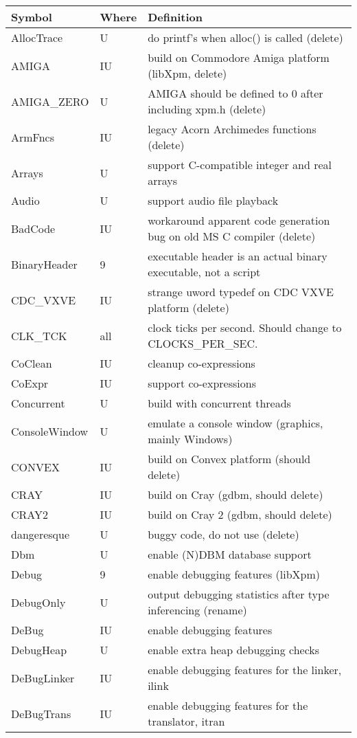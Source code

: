 \begin{xtabular}{|m{1.8in}|m{0.5in}|m{4.0in}|}
\hline
Symbol & Where & Definition \\ \hline
AllocTrace & U & do printf's when alloc() is called (delete) \\
AMIGA & IU & build on Commodore Amiga platform (libXpm, delete) \\ 
AMIGA\_ZERO & U & AMIGA should be defined to 0 after including xpm.h (delete) \\ 
ArmFncs & IU & legacy Acorn Archimedes functions (delete) \\
Arrays & U & support C-compatible integer and real arrays \\
Audio & U & support audio file playback \\
BadCode & IU & workaround apparent code generation bug on old MS C compiler (delete) \\
BinaryHeader & 9 & executable header is an actual binary executable,
		not a script \\
CDC\_VXVE & IU & strange uword typedef on CDC VXVE platform (delete) \\
CLK\_TCK & all & clock ticks per second. Should change to CLOCKS\_PER\_SEC. \\
CoClean & IU & cleanup co-expressions \\
CoExpr & IU & support co-expressions \\
Concurrent & U & build with concurrent threads \\
ConsoleWindow & U & emulate a console window (graphics, mainly Windows) \\
CONVEX & IU & build on Convex platform (should delete) \\
CRAY & IU & build on Cray (gdbm, should delete) \\
CRAY2 & IU & build on Cray 2 (gdbm, should delete) \\
dangeresque & U & buggy code, do not use (delete) \\
Dbm & U & enable (N)DBM database support \\
Debug & 9 & enable debugging features (libXpm) \\
DebugOnly & U & output debugging statistics after type inferencing (rename) \\
DeBug & IU & enable debugging features \\
DebugHeap & U & enable extra heap debugging checks \\
DeBugLinker & IU & enable debugging features for the linker, ilink \\
DeBugTrans & IU & enable debugging features for the translator, itran \\

\end{xtabular}
